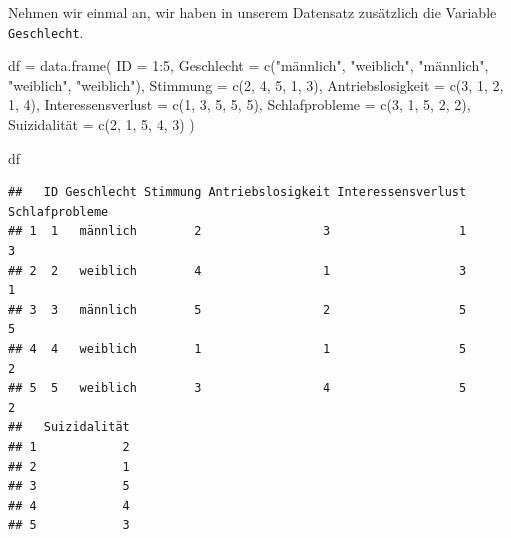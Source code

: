 \documentclass[
]{book}
\newenvironment{Shaded}{\begin{snugshade}}{\end{snugshade}}
\newcommand{\AttributeTok}[1]{\textcolor[rgb]{0.77,0.63,0.00}{#1}}
\newcommand{\DecValTok}[1]{\textcolor[rgb]{0.00,0.00,0.81}{#1}}
\newcommand{\FunctionTok}[1]{\textcolor[rgb]{0.00,0.00,0.00}{#1}}
\newcommand{\NormalTok}[1]{#1}
\newcommand{\OtherTok}[1]{\textcolor[rgb]{0.56,0.35,0.01}{#1}}
\newcommand{\SpecialCharTok}[1]{\textcolor[rgb]{0.00,0.00,0.00}{#1}}
\newcommand{\StringTok}[1]{\textcolor[rgb]{0.31,0.60,0.02}{#1}}
\begin{document}
Nehmen wir einmal an, wir haben in unserem Datensatz zusätzlich die Variable \texttt{Geschlecht}.

\begin{Shaded}
\begin{Highlighting}[]
\NormalTok{df }\OtherTok{=} \FunctionTok{data.frame}\NormalTok{(}
  \AttributeTok{ID =} \DecValTok{1}\SpecialCharTok{:}\DecValTok{5}\NormalTok{,}
  \AttributeTok{Geschlecht =} \FunctionTok{c}\NormalTok{(}\StringTok{"männlich"}\NormalTok{, }\StringTok{"weiblich"}\NormalTok{, }\StringTok{"männlich"}\NormalTok{, }\StringTok{"weiblich"}\NormalTok{, }\StringTok{"weiblich"}\NormalTok{),}
  \AttributeTok{Stimmung =} \FunctionTok{c}\NormalTok{(}\DecValTok{2}\NormalTok{, }\DecValTok{4}\NormalTok{, }\DecValTok{5}\NormalTok{, }\DecValTok{1}\NormalTok{, }\DecValTok{3}\NormalTok{),}
  \AttributeTok{Antriebslosigkeit =} \FunctionTok{c}\NormalTok{(}\DecValTok{3}\NormalTok{, }\DecValTok{1}\NormalTok{, }\DecValTok{2}\NormalTok{, }\DecValTok{1}\NormalTok{, }\DecValTok{4}\NormalTok{),}
  \AttributeTok{Interessensverlust =} \FunctionTok{c}\NormalTok{(}\DecValTok{1}\NormalTok{, }\DecValTok{3}\NormalTok{, }\DecValTok{5}\NormalTok{, }\DecValTok{5}\NormalTok{, }\DecValTok{5}\NormalTok{),}
  \AttributeTok{Schlafprobleme =} \FunctionTok{c}\NormalTok{(}\DecValTok{3}\NormalTok{, }\DecValTok{1}\NormalTok{, }\DecValTok{5}\NormalTok{, }\DecValTok{2}\NormalTok{, }\DecValTok{2}\NormalTok{),}
\NormalTok{  Suizidalität }\OtherTok{=} \FunctionTok{c}\NormalTok{(}\DecValTok{2}\NormalTok{, }\DecValTok{1}\NormalTok{, }\DecValTok{5}\NormalTok{, }\DecValTok{4}\NormalTok{, }\DecValTok{3}\NormalTok{)}
\NormalTok{)}

\NormalTok{df}
\end{Highlighting}
\end{Shaded}

\begin{verbatim}
##   ID Geschlecht Stimmung Antriebslosigkeit Interessensverlust Schlafprobleme
## 1  1   männlich        2                 3                  1              3
## 2  2   weiblich        4                 1                  3              1
## 3  3   männlich        5                 2                  5              5
## 4  4   weiblich        1                 1                  5              2
## 5  5   weiblich        3                 4                  5              2
##   Suizidalität
## 1            2
## 2            1
## 3            5
## 4            4
## 5            3
\end{verbatim}
\end{document}
